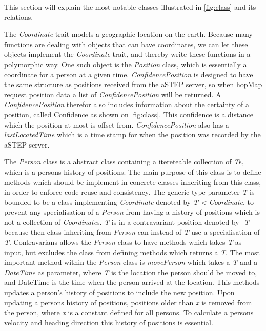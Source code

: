 This section will explain the most notable classes illustrated in \cref{fig:class} and its relations.

The \emph{Coordinate} trait models a geographic location on the earth. Because many functions are dealing with objects that can have coordinates, we can let these objects implement the \emph{Coordinate} trait, and thereby write these functions in a polymorphic way. One such object is the \emph{Position} class, which is essentially a coordinate for a person at a given time. \emph{ConfidencePosition} is designed to have the same structure as positions received from the aSTEP server, so when hopMap request position data a list of \emph{ConfidencePosition} will be returned. A \emph{ConfidencePosition} therefor also includes information about the certainty of a position, called Confidence as shown on \cref{fig:class}. This confidence is a distance which the position at most is offset from. \emph{ConfidencePosition} also has a \emph{lastLocatedTime} which is a time stamp for when the position was recorded by the aSTEP server.


The \emph{Person} class is a abstract class containing a itereteable collection of \emph{T}s, which is a persons history of positions. The main purpose of this class is to define methods which should be implement in concrete classes inheriting from this class, in order to enforce code reuse and consistency. The generic type parameter \emph{T} is bounded to be a class implementing \emph{Coordinate} denoted by \emph{T < Coordinate}, to prevent any specialisation of a \emph{Person} from having a history of positions which is not a collection of \emph{Coordinate}s. \emph{T} is in a contravariant position denoted by \emph{-T} because then class inheriting from \emph{Person} can instead of \emph{T} use a specialisation of \emph{T}.
Contravarians allows the \emph{Person} class to have methods which takes \emph{T} as input, but excludes the class from defining methods which returns a \emph{T}. The most important method within the \emph{Person} class is \emph{movePerson} which takes a \emph{T} and a \emph{DateTime} as parameter, where \emph{T} is the location the person should be moved to, and DateTime is the time when the person arrived at the location. This methods updates a person's history of positions to include the new position. Upon updating a persons history of positions, positions older than \emph{x} is removed from the person, where \emph{x} is a constant defined for all persons. To calculate a persons velocity and heading direction this history of positions is essential. 

